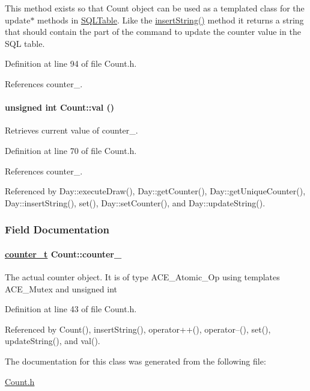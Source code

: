 This method exists so that Count object can be used as a templated class for the update$\ast$ methods in \hyperlink{classSQLTable}{SQLTable}. Like the \hyperlink{classCount_Counta7}{insert\-String()} method it returns a string that should contain the part of the command to update the counter value in the SQL table. 

Definition at line 94 of file Count.h.

References counter\_\-.\hypertarget{classCount_Counta5}{
\paragraph[val]{\setlength{\rightskip}{0pt plus 5cm}unsigned int Count::val ()}\hfill}
\label{classCount_Counta5}


Retrieves current value of counter\_\-. 

Definition at line 70 of file Count.h.

References counter\_\-.

Referenced by Day::execute\-Draw(), Day::get\-Counter(), Day::get\-Unique\-Counter(), Day::insert\-String(), set(), Day::set\-Counter(), and Day::update\-String().

\subsubsection{Field Documentation}
\hypertarget{classCount_Countn0}{
\paragraph[counter\_\-]{\setlength{\rightskip}{0pt plus 5cm}\hyperlink{Count_8h_a0}{counter\_\-t} Count::counter\_\-}\hfill}
\label{classCount_Countn0}


The actual counter object. It is of type ACE\_\-Atomic\_\-Op using templates ACE\_\-Mutex and unsigned int 

Definition at line 43 of file Count.h.

Referenced by Count(), insert\-String(), operator++(), operator--(), set(), update\-String(), and val().

The documentation for this class was generated from the following file:\begin{CompactItemize}
\item 
\hyperlink{Count_8h}{Count.h}\end{CompactItemize}
